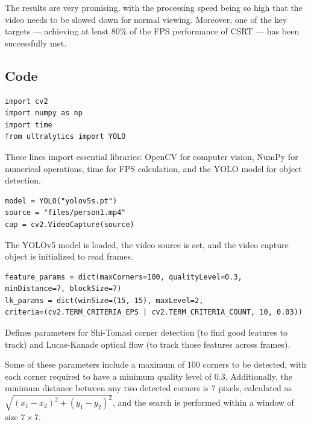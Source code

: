 \documentclass[a4paper,12pt]{article}
\begin{document}
The results are very promising, with the processing speed being so high that the video needs to be slowed down for normal viewing. Moreover, 
one of the key targets — achieving at least \( 80\% \) of the FPS performance of CSRT — has been successfully met.

\subsection{Code}

\begin{tcolorbox}[colback=lightgray!20, colframe=gray!80, title=Library Imports]
\begin{verbatim}
import cv2
import numpy as np
import time
from ultralytics import YOLO
\end{verbatim}
\end{tcolorbox}

These lines import essential libraries: OpenCV for computer vision, NumPy for numerical operations, time for FPS calculation, and the YOLO model for object detection.

\vspace{0.5em}
\begin{tcolorbox}[colback=lightgray!20, colframe=gray!80, title=Model and Video Initialization]
\begin{verbatim}
model = YOLO("yolov5s.pt")
source = "files/person1.mp4"
cap = cv2.VideoCapture(source)
\end{verbatim}
\end{tcolorbox}

The YOLOv5 model is loaded, the video source is set, and the video capture object is initialized to read frames.

\vspace{0.5em}
\begin{tcolorbox}[colback=lightgray!20, colframe=gray!80, title=Feature Detection Parameters]
\begin{verbatim}
feature_params = dict(maxCorners=100, qualityLevel=0.3, 
minDistance=7, blockSize=7)
lk_params = dict(winSize=(15, 15), maxLevel=2, 
criteria=(cv2.TERM_CRITERIA_EPS | cv2.TERM_CRITERIA_COUNT, 10, 0.03))
\end{verbatim}
\end{tcolorbox}

Defines parameters for Shi-Tomasi corner detection (to find good features to track) and Lucas-Kanade optical flow (to track those features across frames).

Some of these parameters include a maximum of 100 corners to be detected, with each corner required to have a minimum quality level of 0.3. 
Additionally, the minimum distance between any two detected corners is 7 pixels, calculated as \( \sqrt{(x_1 - x_2)^2 + (y_1 - y_2)^2} \), 
and the search is performed within a window of size \( 7 \times 7 \).
\end{document}
